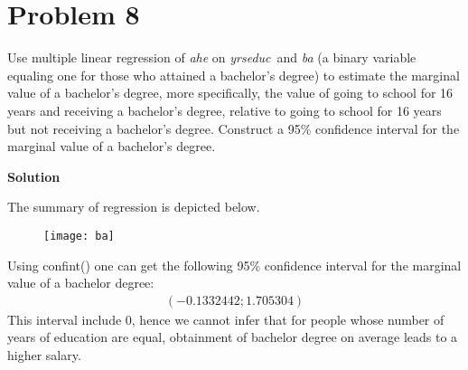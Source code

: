 \documentclass[a4paper]{article}
\newcommand{\yrseduc}{\textit{yrseduc}}
\begin{document}
\section*{Problem 8}
Use multiple linear regression of \textit{ahe} on \yrseduc\ and \textit{ba} (a binary variable equaling one for
those who attained a bachelor’s degree) to estimate the marginal value of a bachelor’s degree,
more specifically, the value of going to school for 16 years and receiving a bachelor’s degree,
relative to going to school for 16 years but not receiving a bachelor’s degree. Construct a 95\%
confidence interval for the marginal value of a bachelor’s degree.

\textbf{Solution}


The summary of regression is depicted below.
	\begin{figure}[h]
	\centering
	\texttt{[image: ba]}
	\caption{}\label{fig1}
\end{figure}



Using confint() one can get the following 95\% confidence interval for the marginal value of a bachelor degree:
\begin{align*}
(-0.1332442; 1.705304)
\end{align*}
This interval include 0, hence we cannot infer that for people whose number of years of education are equal, obtainment of bachelor degree on average leads to a higher salary.
\end{document}
